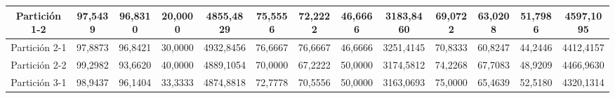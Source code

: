 \documentclass[12pt]{article}
\begin{document}
\begin{table}[H]
{\begin{tabular}{|c|cccc|cccc|cccc|}
Partición 1-2 & \multicolumn{1}{c|}{97,5439}                                                  & \multicolumn{1}{c|}{96,8310}                                                 & \multicolumn{1}{c|}{20,0000} & 4855,4829 & \multicolumn{1}{c|}{75,5556}                                                  & \multicolumn{1}{c|}{72,2222}                                                 & \multicolumn{1}{c|}{46,6666} & 3183,8460 & \multicolumn{1}{c|}{69,0722}                                                  & \multicolumn{1}{c|}{63,0208}                                                 & \multicolumn{1}{c|}{51,7986} & 4597,1095 \\ \hline
Partición 2-1 & \multicolumn{1}{c|}{97,8873}                                                  & \multicolumn{1}{c|}{96,8421}                                                 & \multicolumn{1}{c|}{30,0000} & 4932,8456 & \multicolumn{1}{c|}{76,6667}                                                  & \multicolumn{1}{c|}{76,6667}                                                 & \multicolumn{1}{c|}{46,6666} & 3251,4145 & \multicolumn{1}{c|}{70,8333}                                                  & \multicolumn{1}{c|}{60,8247}                                                 & \multicolumn{1}{c|}{44,2446} & 4412,4157 \\ \hline
Partición 2-2 & \multicolumn{1}{c|}{99,2982}                                                  & \multicolumn{1}{c|}{93,6620}                                                 & \multicolumn{1}{c|}{40,0000} & 4889,1054 & \multicolumn{1}{c|}{70,0000}                                                  & \multicolumn{1}{c|}{67,2222}                                                 & \multicolumn{1}{c|}{50,0000} & 3174,5812 & \multicolumn{1}{c|}{74,2268}                                                  & \multicolumn{1}{c|}{67,7083}                                                 & \multicolumn{1}{c|}{48,9209} & 4466,9630 \\ \hline
Partición 3-1 & \multicolumn{1}{c|}{98,9437}                                                  & \multicolumn{1}{c|}{96,1404}                                                 & \multicolumn{1}{c|}{33,3333} & 4874,8818 & \multicolumn{1}{c|}{72,7778}                                                  & \multicolumn{1}{c|}{70,5556}                                                 & \multicolumn{1}{c|}{50,0000} & 3163,0693 & \multicolumn{1}{c|}{75,0000}                                                  & \multicolumn{1}{c|}{65,4639}                                                 & \multicolumn{1}{c|}{52,5180} & 4320,1314 \\ \hline

\end{tabular}}
\end{table}
\end{document}

